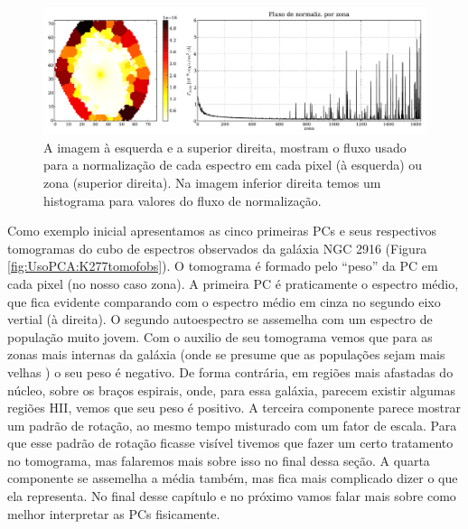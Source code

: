 \begin{figure}
    \includegraphics[width=1.\textwidth]{figuras/K0277-fobs_norm.pdf}
    \caption[Fluxos de normalização para cada zona da galáxia K0277.]
    {A imagem à esquerda e a superior direita, mostram o fluxo usado para a normalização de cada espectro em
    cada pixel (à esquerda) ou zona (superior direita). Na imagem inferior direita temos um histograma para valores do
    fluxo de normalização.}
    \label{fig:UsoPCA:K277fobsnorm}
\end{figure}

Como exemplo inicial apresentamos as cinco primeiras PCs e seus respectivos tomogramas do cubo de espectros observados
da galáxia NGC 2916 (Figura \ref{fig:UsoPCA:K277tomofobs}). O tomograma é formado pelo ``peso'' da PC em cada pixel (no
nosso caso zona). A primeira PC é praticamente o espectro médio, que fica evidente comparando com o espectro médio em
cinza no segundo eixo vertial (à direita). O segundo autoespectro se assemelha com um espectro de população muito jovem.
Com o auxilio de seu tomograma vemos que para as zonas mais internas da galáxia (onde se presume que as populações sejam
mais velhas \citneed) o seu peso é negativo. De forma contrária, em regiões mais afastadas do núcleo, sobre os braços
espirais, onde, para essa galáxia, parecem existir algumas regiões HII, vemos que seu peso é positivo. A terceira
componente parece mostrar um padrão de rotação, ao mesmo tempo misturado com um fator de escala. Para que esse padrão de
rotação ficasse visível tivemos que fazer um certo tratamento no tomograma, mas falaremos mais sobre isso no final
dessa seção. A quarta componente se assemelha a média também, mas fica mais complicado dizer o que ela representa. No
final desse capítulo e no próximo vamos falar mais sobre como melhor interpretar as PCs fisicamente.

